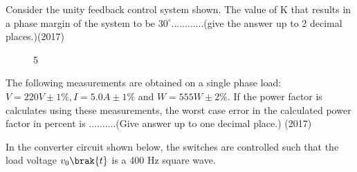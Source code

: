     \item Consider the unity feedback control system shown. The value of K that results in a phase margin of the system to be $30^{\circ}$............(give the answer up to 2 decimal places.)\hfill (2017)
    \begin{figure}[!ht]
        \centering
        \caption{5}
    \end{figure}
    \item The following measurements are obtained on a single phase load: $V = 220 V\pm 1\%, I = 5.0A\pm 1\%$ and $W = 555W \pm 2\%$. If the power factor is calculates using these measurements, the worst case error in the calculated power factor in percent is ..........(Give answer up to one decimal place.) \hfill (2017)
    \item In the converter circuit shown below, the switches are controlled such that the load voltage $v_0\brak{t}$ is a 400 Hz square wave.
